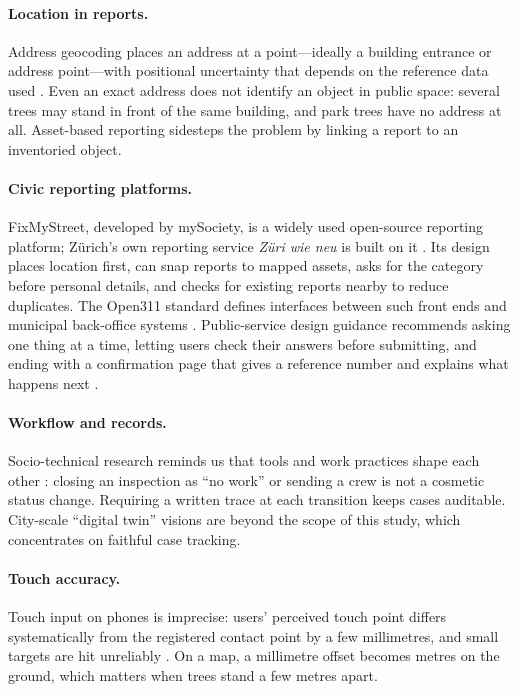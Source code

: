 \documentclass[11pt,a4paper]{article}
\begin{document}
\paragraph{Location in reports.}
Address geocoding places an address at a point---ideally a building entrance or address point---with positional uncertainty that depends on the reference data used \cite{zandbergen2008}. Even an exact address does not identify an object in public space: several trees may stand in front of the same building, and park trees have no address at all. Asset-based reporting sidesteps the problem by linking a report to an inventoried object.

\paragraph{Civic reporting platforms.}
FixMyStreet, developed by mySociety, is a widely used open-source reporting platform; Zürich's own reporting service \emph{Züri wie neu} is built on it \cite{fms,zwn}. Its design places location first, can snap reports to mapped assets, asks for the category before personal details, and checks for existing reports nearby to reduce duplicates. The Open311 standard defines interfaces between such front ends and municipal back-office systems \cite{open311}. Public-service design guidance recommends asking one thing at a time, letting users check their answers before submitting, and ending with a confirmation page that gives a reference number and explains what happens next \cite{govuk}.

\paragraph{Workflow and records.}
Socio-technical research reminds us that tools and work practices shape each other \cite{trist1982}: closing an inspection as ``no work'' or sending a crew is not a cosmetic status change. Requiring a written trace at each transition keeps cases auditable. City-scale ``digital twin'' visions \cite{batty2018} are beyond the scope of this study, which concentrates on faithful case tracking.

\paragraph{Touch accuracy.}
Touch input on phones is imprecise: users' perceived touch point differs systematically from the registered contact point by a few millimetres, and small targets are hit unreliably \cite{holz2010,parhi2006}. On a map, a millimetre offset becomes metres on the ground, which matters when trees stand a few metres apart.
\end{document}
